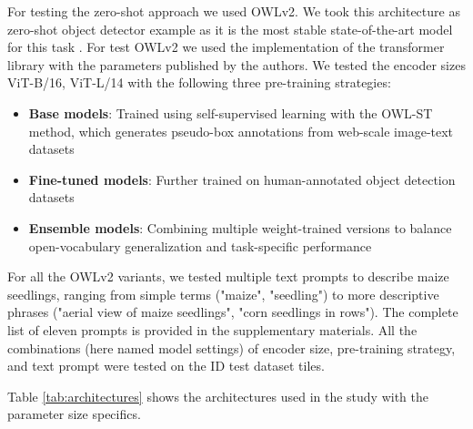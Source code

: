 \documentclass{article}
\begin{document}
For testing the zero-shot approach we used OWLv2.
We took this architecture as zero-shot object detector example as it is the most stable 
state-of-the-art model for this task \cite{mindererScalingOpenVocabularyObject2023,liuGroundingDINOMarrying2025}.
For test OWLv2 we used the implementation of the transformer library \cite{wolfTransformersStateoftheArtNatural2020}
with the parameters published by the authors.
We tested the encoder sizes ViT-B/16, ViT-L/14 with the following three pre-training 
strategies:

\begin{itemize}
    \item \textbf{Base models}: Trained using self-supervised learning with the OWL-ST method, which generates pseudo-box annotations from web-scale image-text datasets
    \item \textbf{Fine-tuned models}: Further trained on human-annotated object detection datasets
    \item \textbf{Ensemble models}: Combining multiple weight-trained versions to balance open-vocabulary generalization and task-specific performance
\end{itemize}

For all the OWLv2 variants, we tested multiple text prompts to describe maize seedlings, ranging from simple terms ("maize", "seedling") to more descriptive phrases ("aerial view of maize seedlings", "corn seedlings in rows"). The complete list of eleven prompts is provided in the supplementary materials. All the combinations (here named model settings) of encoder size, pre-training strategy, and text prompt were tested on the ID test dataset tiles.

Table \ref{tab:architectures} shows the architectures used in the study 
with the parameter size specifics.
\end{document}
